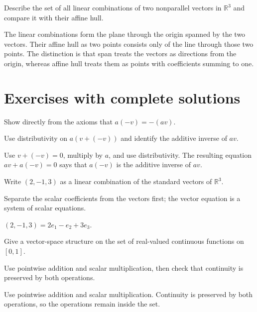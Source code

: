 \begin{problem}\label{prob:i01-problem-12}
Describe the set of all linear combinations of two nonparallel vectors in $\mathbb R^3$ and compare it with their affine hull.
\end{problem}
\begin{solution}
The linear combinations form the plane through the origin spanned by the two vectors. Their affine hull as two points consists only of the line through those two points. The distinction is that span treats the vectors as directions from the origin, whereas affine hull treats them as points with coefficients summing to one.
\end{solution}


\section{Exercises with complete solutions}

\begin{exercise}\label{exr:i01-01}
Show directly from the axioms that $a(-v)=-(av)$.
\end{exercise}
\begin{hint}
Use distributivity on \(a(v+(-v))\) and identify the additive inverse of \(av\).
\end{hint}
\begin{solution}
Use $v+(-v)=0$, multiply by $a$, and use distributivity. The resulting equation $av+a(-v)=0$ says that $a(-v)$ is the additive inverse of $av$.
\end{solution}

\begin{exercise}\label{exr:i01-02}
Write $(2,-1,3)$ as a linear combination of the standard vectors of $\mathbb R^3$.
\end{exercise}
\begin{hint}
Separate the scalar coefficients from the vectors first; the vector equation is a system of scalar equations.
\end{hint}
\begin{solution}
$(2,-1,3)=2e_1-e_2+3e_3$.
\end{solution}

\begin{exercise}\label{exr:i01-03}
Give a vector-space structure on the set of real-valued continuous functions on $[0,1]$.
\end{exercise}
\begin{hint}
Use pointwise addition and scalar multiplication, then check that continuity is preserved by both operations.
\end{hint}
\begin{solution}
Use pointwise addition and scalar multiplication. Continuity is preserved by both operations, so the operations remain inside the set.
\end{solution}

